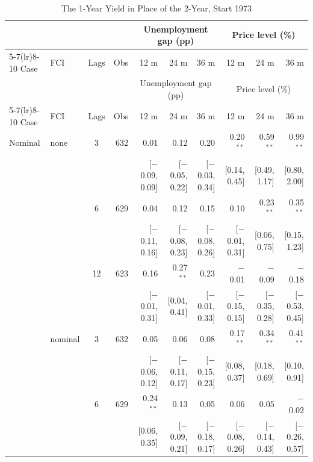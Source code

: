 \begingroup\scriptsize\setlength{\tabcolsep}{0.9pt}
\begin{longtable}{llcrrrrrrr}
\caption{The 1-Year Yield in Place of the 2-Year, Start 1973}\label{tab:appR973}\\
\toprule
 & & & & \multicolumn{3}{c}{Unemployment gap (pp)} & \multicolumn{3}{c}{Price level (\%)}\\ \cmidrule(lr){5-7}\cmidrule(lr){8-10}
Case & FCI & Lags & Obs & 12 m & 24 m & 36 m & 12 m & 24 m & 36 m\\
\midrule\endfirsthead
\toprule
 & & & & \multicolumn{3}{c}{Unemployment gap (pp)} & \multicolumn{3}{c}{Price level (\%)}\\ \cmidrule(lr){5-7}\cmidrule(lr){8-10}
Case & FCI & Lags & Obs & 12 m & 24 m & 36 m & 12 m & 24 m & 36 m\\
\midrule\endhead
\bottomrule\endfoot
Nominal & none & 3 & 632 & 0.01 & 0.12 & 0.20 & 0.20$^{**}$ & 0.59$^{**}$ & 0.99$^{**}$\\
 & & & & {\scriptsize [$-$0.09, 0.09]} & {\scriptsize [$-$0.05, 0.22]} & {\scriptsize [$-$0.03, 0.34]} & {\scriptsize [0.14, 0.45]} & {\scriptsize [0.49, 1.17]} & {\scriptsize [0.80, 2.00]}\\
 &  & 6 & 629 & 0.04 & 0.12 & 0.15 & 0.10 & 0.23$^{**}$ & 0.35$^{**}$\\
 & & & & {\scriptsize [$-$0.11, 0.16]} & {\scriptsize [$-$0.08, 0.23]} & {\scriptsize [$-$0.08, 0.26]} & {\scriptsize [$-$0.01, 0.31]} & {\scriptsize [0.06, 0.75]} & {\scriptsize [0.15, 1.23]}\\
 &  & 12 & 623 & 0.16 & 0.27$^{**}$ & 0.23 & $-$0.01 & $-$0.09 & $-$0.18\\
 & & & & {\scriptsize [$-$0.01, 0.31]} & {\scriptsize [0.04, 0.41]} & {\scriptsize [$-$0.01, 0.33]} & {\scriptsize [$-$0.15, 0.15]} & {\scriptsize [$-$0.35, 0.28]} & {\scriptsize [$-$0.53, 0.45]}\\
 & nominal & 3 & 632 & 0.05 & 0.06 & 0.08 & 0.17$^{**}$ & 0.34$^{**}$ & 0.41$^{**}$\\
 & & & & {\scriptsize [$-$0.06, 0.12]} & {\scriptsize [$-$0.11, 0.17]} & {\scriptsize [$-$0.15, 0.23]} & {\scriptsize [0.08, 0.37]} & {\scriptsize [0.18, 0.69]} & {\scriptsize [0.10, 0.91]}\\
 &  & 6 & 629 & 0.24$^{**}$ & 0.13 & 0.05 & 0.06 & 0.05 & $-$0.02\\
 & & & & {\scriptsize [0.06, 0.35]} & {\scriptsize [$-$0.09, 0.21]} & {\scriptsize [$-$0.18, 0.17]} & {\scriptsize [$-$0.08, 0.26]} & {\scriptsize [$-$0.14, 0.43]} & {\scriptsize [$-$0.26, 0.57]}\\

\end{longtable}
